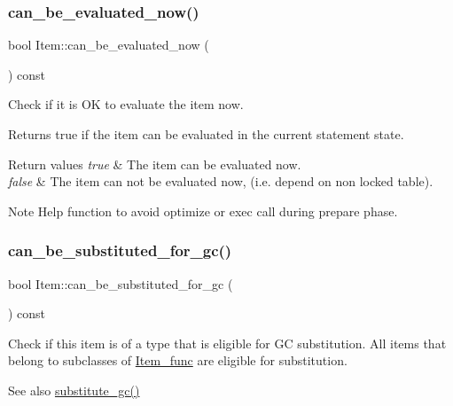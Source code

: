 \subsubsection{\texorpdfstring{can\+\_\+be\+\_\+evaluated\+\_\+now()}{can\_be\_evaluated\_now()}}
{\footnotesize\ttfamily bool Item\+::can\+\_\+be\+\_\+evaluated\+\_\+now (\begin{DoxyParamCaption}{ }\end{DoxyParamCaption}) const\hspace{0.3cm}{\ttfamily [virtual]}}

Check if it is OK to evaluate the item now.

\begin{DoxyReturn}{Returns}
true if the item can be evaluated in the current statement state. 
\end{DoxyReturn}

\begin{DoxyRetVals}{Return values}
{\em true} & The item can be evaluated now. \\
\hline
{\em false} & The item can not be evaluated now, (i.\+e. depend on non locked table).\\
\hline
\end{DoxyRetVals}
\begin{DoxyNote}{Note}
Help function to avoid optimize or exec call during prepare phase. 
\end{DoxyNote}
\mbox{\label{classItem_a6412d8808519ea336ea6d85ea5efc720}} 
\subsubsection{\texorpdfstring{can\+\_\+be\+\_\+substituted\+\_\+for\+\_\+gc()}{can\_be\_substituted\_for\_gc()}}
{\footnotesize\ttfamily bool Item\+::can\+\_\+be\+\_\+substituted\+\_\+for\+\_\+gc (\begin{DoxyParamCaption}{ }\end{DoxyParamCaption}) const\hspace{0.3cm}{\ttfamily [inline]}}

Check if this item is of a type that is eligible for GC substitution. All items that belong to subclasses of \mbox{\hyperlink{classItem__func}{Item\+\_\+func}} are eligible for substitution. \begin{DoxySeeAlso}{See also}
\mbox{\hyperlink{group__Query__Optimizer_gaa95a062cdd785687a638e01d7ad85d11}{substitute\+\_\+gc()}} 
\end{DoxySeeAlso}
\mbox{\label{classItem_a16558f8205877603fbc942dcd880c673}} 
